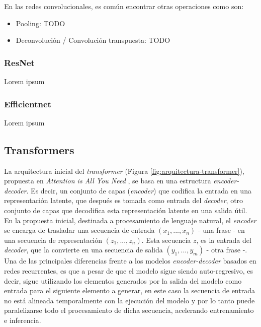 En las redes convolucionales, es común encontrar otras operaciones como son:
\begin{itemize}
\item Pooling: TODO
\item Deconvolución / Convolución transpuesta: TODO
\end{itemize}

\subsubsection{ResNet}
Lorem ipsum

\subsubsection{Efficientnet}
Lorem ipsum

\subsection{Transformers}
La arquitectura inicial del \textit{transformer} (Figura \ref{fig:arquitectura-transformer}), propuesta en \textit{Attention is All You Need} \cite{NIPS2017_3f5ee243}, se basa en una estructura \textit{encoder-decoder}. Es decir, un conjunto de capas (\textit{encoder}) que codifica la entrada en una representación latente, que después es tomada como entrada del \textit{decoder}, otro conjunto de capas que decodifica esta representación latente en una salida útil. En la propuesta inicial, destinada a procesamiento de lenguaje natural, el \textit{encoder} se encarga de trasladar una secuencia de entrada $(x_1, ..., x_n)$ - una frase - en una secuencia de representación $(z_1, ..., z_n)$. Esta secuencia $z$, es la entrada del \textit{decoder}, que la convierte en una secuencia de salida $(y_1, ..., y_m)$ - otra frase -. Una de las principales diferencias frente a los modelos \textit{encoder-decoder} basados en redes recurrentes, es que a pesar de que el modelo sigue siendo auto-regresivo, es decir, sigue utilizando los elementos generados por la salida del modelo como entrada para el siguiente elemento a generar, en este caso la secuencia de entrada no está alineada temporalmente con la ejecución del modelo y por lo tanto puede paralelizarse todo el procesamiento de dicha secuencia, acelerando entrenamiento e inferencia.

